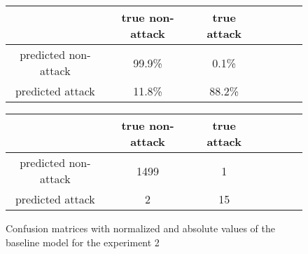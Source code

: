 \documentclass{article}
\begin{document}


\begin{figure}[h]
    \centering
    \begin{tabular}{ |c|c|c|c|c|c|c| }
     \hline
      & true non-attack & true attack \\
     \hline
     predicted non-attack & 99.9\% & 0.1\% \\
     \hline
     predicted attack & 11.8\% & 88.2\% \\
     \hline
    \end{tabular}

    \vspace{0.2cm}

    \centering
    \begin{tabular}{ |c|c|c|c|c|c|c| }
     \hline
      & true non-attack & true attack \\
     \hline
     predicted non-attack & 1499 & 1 \\
     \hline
     predicted attack & 2 & 15 \\
     \hline
    \end{tabular}
    \caption{Confusion matrices with normalized and absolute values of the baseline model for the experiment 2}
    \label{fig-exp2-baseline}
\end{figure}


\end{document}
